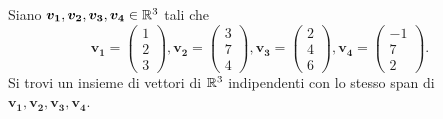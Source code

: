 \begin{example}
    Siano $\bm{v_1}, \bm{v_2}, \bm{v_3}, \bm{v_4} \in \mathbb{R}^3$ tali che \[
        \bm{v_1} = \begin{pmatrix}
            1 \\ 2 \\ 3
        \end{pmatrix}, \bm{v_2} = \begin{pmatrix}
            3 \\ 7 \\ 4
        \end{pmatrix}, \bm{v_3} = \begin{pmatrix}
            2 \\ 4 \\ 6
        \end{pmatrix}, \bm{v_4} = \begin{pmatrix}
            -1 \\ 7 \\ 2
        \end{pmatrix}.
    \] Si trovi un insieme di vettori di $\mathbb{R}^3$ indipendenti con lo stesso span di $\bm{v_1}, \bm{v_2}, \bm{v_3}, \bm{v_4}$.
\end{example}
